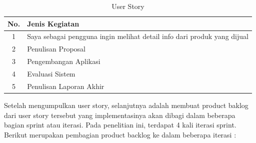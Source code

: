 \begin{table}[H]
	\begin{center}
	\caption{User Story}
	\label{tab:jadwal}
	\begin{tabular}{|c|l|}
	\hline
	No.&Jenis Kegiatan\\
	\hline
	1&Saya sebagai pengguna ingin melihat detail info dari produk yang dijual\\
	\hline
	2&Penulisan Proposal\\
	\hline
	3&Pengembangan Aplikasi\\
	\hline
	4&Evaluasi Sistem\\
	\hline
	5&Penulisan Laporan Akhir\\
	\hline
	\end{tabular}
	\end{center}
\end{table}

\par Setelah mengumpulkan user story, selanjutnya adalah membuat product
baklog dari user story tersebut yang implementasinya akan dibagi dalam beberapa
bagian sprint atau iterasi. Pada penelitian ini, terdapat 4 kali iterasi sprint. Berikut
merupakan pembagian product backlog ke dalam beberapa iterasi :


